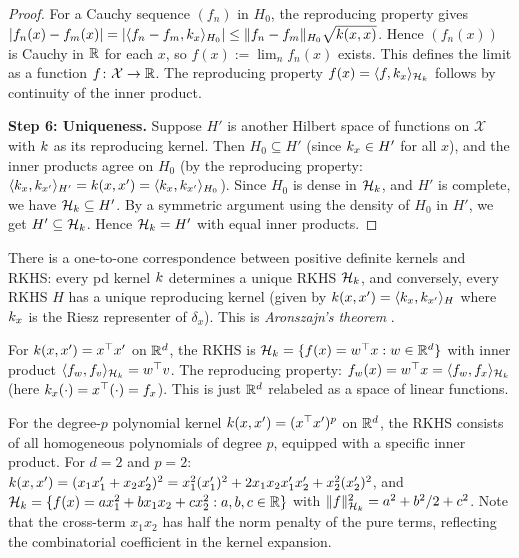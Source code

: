 \documentclass[11pt,a4paper]{article}
\begin{document}
\begin{proof}
For a Cauchy sequence $(f_n)$ in $H_0$, the reproducing property
gives $|f_n(x) - f_m(x)| = |\langle f_n - f_m, k_x
\rangle_{H_0}| \le \|f_n - f_m\|_{H_0} \sqrt{k(x, x)}$.
Hence $(f_n(x))$ is Cauchy in $\mathbb{R}$ for each $x$, so $f(x) :=
\lim_n f_n(x)$ exists. This defines the limit as a function
$f \colon \mathcal{X} \to \mathbb{R}$. The reproducing property
$f(x) = \langle f, k_x \rangle_{\mathcal{H}_k}$ follows by
continuity of the inner product.

\textbf{Step 6: Uniqueness.} Suppose $H'$ is another Hilbert
space of functions on $\mathcal{X}$ with $k$ as its
reproducing kernel. Then $H_0 \subseteq H'$ (since $k_x
\in H'$ for all $x$), and the inner products agree on $H_0$
(by the reproducing property: $\langle k_x, k_{x'}
\rangle_{H'} = k(x, x') = \langle k_x, k_{x'}
\rangle_{H_0}$). Since $H_0$ is dense in $\mathcal{H}_k$, and $H'$ is
complete, we have $\mathcal{H}_k \subseteq H'$. By a symmetric argument
using the density of $H_0$ in $H'$, we get $H' \subseteq \mathcal{H}_k$.
Hence $\mathcal{H}_k = H'$ with equal inner products.
\end{proof}

\begin{keyresult}[title={Aronszajn's Theorem}]
\label{kr:aronszajn}
There is a one-to-one correspondence between positive definite
kernels and RKHS: every pd kernel $k$ determines a unique
RKHS $\mathcal{H}_k$, and conversely, every RKHS $H$ has a unique
reproducing kernel (given by $k(x, x') = \langle
k_x, k_{x'} \rangle_H$ where $k_x$ is
the Riesz representer of $\delta_x$). This is
\emph{Aronszajn's theorem} \citep{aronszajn1950}.
\end{keyresult}

\begin{example}
\label{ex:linear-rkhs}
For $k(x, x') = x^\top x'$ on $\mathbb{R}^d$, the RKHS is $\mathcal{H}_k =
\{f(x) = w^\top x : w \in \mathbb{R}^d\}$ with inner product $\langle
f_w, f_v \rangle_{\mathcal{H}_k} = w^\top v$. The reproducing property:
$f_w(x) = w^\top x = \langle f_w, f_x \rangle_{\mathcal{H}_k}$ (here
$k_x(\cdot) = x^\top (\cdot) = f_x$). This is just $\mathbb{R}^d$
relabeled as a space of linear functions.
\end{example}

\begin{example}
\label{ex:poly-rkhs}
For the degree-$p$ polynomial kernel $k(x, x') = (x^\top x')^p$
on $\mathbb{R}^d$, the RKHS consists of all homogeneous polynomials of
degree $p$, equipped with a specific inner product. For $d = 2$
and $p = 2$: $k(x, x') = (x_1 x_1' + x_2 x_2')^2 = x_1^2
(x_1')^2 + 2 x_1 x_2 x_1' x_2' + x_2^2 (x_2')^2$, and $\mathcal{H}_k =
\{f(x) = a x_1^2 + b x_1 x_2 + c x_2^2 : a, b, c \in \mathbb{R}\}$ with
$\|f\|_{\mathcal{H}_k}^2 = a^2 + b^2/2 + c^2$. Note that the cross-term
$x_1 x_2$ has half the norm penalty of the pure terms, reflecting
the combinatorial coefficient in the kernel expansion.
\end{example}
\end{document}
